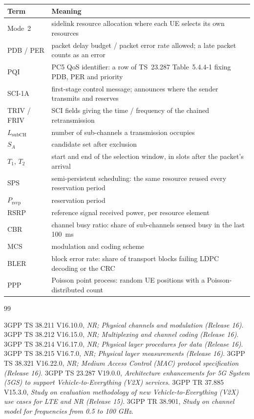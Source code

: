 \documentclass{article}
\newcommand{\Tone}{T_1}
\newcommand{\Ttwo}{T_2}
\newcommand{\Lsub}{L_{\mathrm{subCH}}}
\newcommand{\Prsvp}{P_{\mathrm{rsvp}}}
\begin{document}
\begin{table}[H]
\centering
\small
\begin{tabularx}{\textwidth}{l X}
\toprule
\textbf{Term} & \textbf{Meaning} \\
\midrule
Mode~2 & sidelink resource allocation where each UE selects its own resources \\
PDB / PER & packet delay budget / packet error rate allowed; a late packet counts as an error \\
PQI & PC5 QoS identifier: a row of TS~23.287 Table~5.4.4-1 fixing PDB, PER and priority \\
SCI-1A & first-stage control message; announces where the sender transmits and reserves \\
TRIV / FRIV & SCI fields giving the time / frequency of the chained retransmission \\
$\Lsub$ & number of sub-channels a transmission occupies \\
$S_A$ & candidate set after exclusion \\
$\Tone$, $\Ttwo$ & start and end of the selection window, in slots after the packet's arrival \\
SPS & semi-persistent scheduling: the same resource reused every reservation period \\
$\Prsvp$ & reservation period \\
RSRP & reference signal received power, per resource element \\
CBR & channel busy ratio: share of sub-channels sensed busy in the last 100~ms \\
MCS & modulation and coding scheme \\
BLER & block error rate: share of transport blocks failing LDPC decoding or the CRC \\
PPP & Poisson point process: random UE positions with a Poisson-distributed count \\
\bottomrule
\end{tabularx}
\end{table}

\begin{thebibliography}{99}

 3GPP TS 38.211 V16.10.0, \emph{NR; Physical channels and modulation (Release 16)}.
 3GPP TS 38.212 V16.15.0, \emph{NR; Multiplexing and channel coding (Release 16)}.
 3GPP TS 38.214 V16.17.0, \emph{NR; Physical layer procedures for data (Release 16)}.
 3GPP TS 38.215 V16.7.0, \emph{NR; Physical layer measurements (Release 16)}.
 3GPP TS 38.321 V16.22.0, \emph{NR; Medium Access Control (MAC) protocol specification (Release 16)}.
 3GPP TS 23.287 V19.0.0, \emph{Architecture enhancements for 5G System (5GS) to support Vehicle-to-Everything (V2X) services}.
 3GPP TR 37.885 V15.3.0, \emph{Study on evaluation methodology of new Vehicle-to-Everything (V2X) use cases for LTE and NR (Release 15)}.
 3GPP TR 38.901, \emph{Study on channel model for frequencies from 0.5 to 100 GHz}.

\end{thebibliography}
\end{document}
